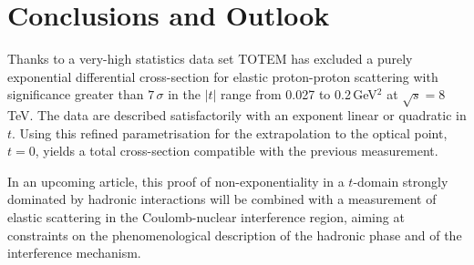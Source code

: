 
\section{Conclusions and Outlook}
%
Thanks to a very-high statistics data set TOTEM has excluded a purely exponential differential 
cross-section for elastic proton-proton scattering with significance greater than $7\,\sigma$
in the $|t|$ range from 0.027 to 0.2\,GeV$^{2}$ at $\sqrt{s}=8\,$TeV. The data
are described satisfactorily with an exponent linear or quadratic in $t$.
Using this refined parametrisation for the extrapolation to the optical point,
$t = 0$, yields a total cross-section compatible with the previous measurement.

In an upcoming article, this proof of non-exponentiality in a 
$t$-domain strongly
dominated by hadronic interactions will be combined with a measurement of 
elastic scattering in the Coulomb-nuclear interference region, aiming at 
constraints on the phenomenological description of the hadronic phase and of 
the interference mechanism.

